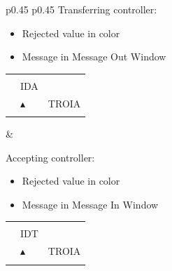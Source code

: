 \documentclass[a4paper,oneside,11pt]{memoir}
\begin{document}
\begin{longtable}{p{} p{}}
  Transferring controller:

  \begin{itemize}
    \item Rejected value in  color
    \item Message in Message Out Window
  \end{itemize}
  
  \begin{tabular}{
    >{\columncolor{Flight Highlight}}l 
    >{\columncolor{Flight Highlight}}l
    >{\columncolor{Flight Highlight}}l }
    {\color{Warning} H360} & {\color{Assumed} }       & {\color{Assumed} }      \\
    {\color{Assumed} ABC123} & {\color{Coordination} IDA}       & {\color{Assumed} }      \\
    {\color{Assumed} 100}    & {\color{Assumed} $\blacktriangle$} & {\color{Assumed} TROIA} \\
    {\color{Assumed} 180}    & {\color{Assumed} }          & {\color{Assumed} }\\         
  \end{tabular}

  &

  Accepting controller:

  \begin{itemize}
    \item Rejected value in  color
    \item Message in Message In Window
  \end{itemize}
  
  \begin{tabular}{
    >{\columncolor{Flight Highlight}}l 
    >{\columncolor{Flight Highlight}}l
    >{\columncolor{Flight Highlight}}l }
    {\color{Warning} H360} & {\color{Coordination} }       & {\color{Coordination} }      \\
    {\color{Coordination} ABC123} & {\color{Coordination} IDT}       & {\color{Coordination} }      \\
    {\color{Coordination} 100}    & {\color{Coordination} $\blacktriangle$} & {\color{Coordination} TROIA} \\
    {\color{Coordination} 180}    & {\color{Coordination} }          & {\color{Coordination} }  \\     
  \end{tabular}
\end{longtable}
\end{document}
